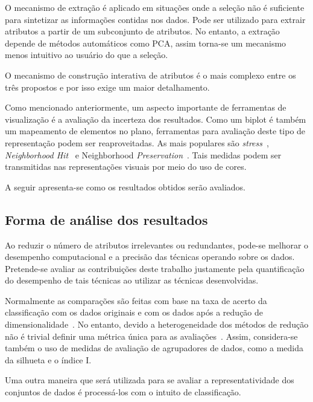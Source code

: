 O mecanismo de extração é aplicado em situações onde a
seleção não é suficiente para sintetizar as informações
contidas nos dados. Pode ser utilizado para extrair
atributos a partir de um subconjunto de atributos. No
entanto, a extração depende de métodos automáticos como PCA,
assim torna-se um mecanismo menos intuitivo ao usuário do
que a seleção. 

O mecanismo de construção interativa de atributos é o mais
complexo entre os três propostos e por isso exige um maior
detalhamento.

Como mencionado anteriormente, um aspecto importante de
ferramentas de visualização é a avaliação da incerteza dos
resultados. Como um biplot é também um mapeamento de
elementos no plano, ferramentas para avaliação deste tipo de
representação podem ser reaproveitadas. As mais populares
são \emph{stress}~\cite{Kruskal1964}, \emph{Neighborhood
Hit}~\cite{Paulovich2008} e Neighborhood
\emph{Preservation}~\cite{Paulovich2008a}. Tais medidas
podem ser transmitidas nas representações visuais por meio
do uso de cores. 

A seguir apresenta-se como os resultados obtidos serão avaliados.

\subsection{Forma de análise dos resultados}

Ao reduzir o número de atributos irrelevantes ou
redundantes, pode-se melhorar o desempenho computacional e a
precisão das técnicas operando sobre os dados.  Pretende-se
avaliar as contribuições deste trabalho justamente pela
quantificação do desempenho de tais técnicas ao utilizar as
técnicas desenvolvidas.

Normalmente as
comparações são feitas com base na taxa de acerto da
classificação com os dados originais e com os dados após a
redução de dimensionalidade~\cite{Guyon2003,Joshi2007}. No
entanto, devido a heterogeneidade dos métodos de redução
não é trivial definir uma métrica única para as
avaliações~\cite{Medeiros2011}. Assim, considera-se também
o uso de medidas de avaliação de agrupadores de dados, como
a medida da silhueta e o índice I.

Uma outra maneira que será utilizada para se avaliar a
representatividade dos conjuntos de dados é processá-los com
o intuito de classificação.
